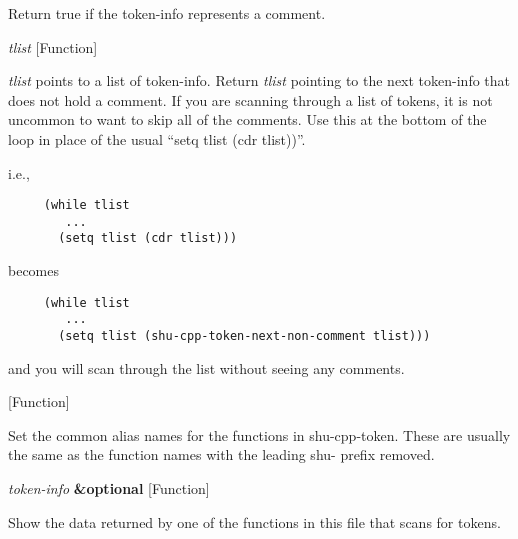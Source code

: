 \begin{doc-string}
Return true if the token-info represents a comment.
\end{doc-string}

\vspace{1em}
\noindent
{}
\usebox{\funcname}\emph{tlist}
 \hfill [Function]

\begin{doc-string}
\emph{tlist} points to a list of token-info.  Return \emph{tlist} pointing to the next
token-info that does not hold a comment.  If you are scanning through a list
of tokens, it is not uncommon to want to skip all of the comments.  Use this
at the bottom of the loop in place of the usual ``setq tlist (cdr tlist))''.

i.e.,

\small{\begin{verbatim}
     (while tlist
        ...
       (setq tlist (cdr tlist)))
\end{verbatim}}

becomes

\small{\begin{verbatim}
     (while tlist
        ...
       (setq tlist (shu-cpp-token-next-non-comment tlist)))
\end{verbatim}}

and you will scan through the list without seeing any comments.
\end{doc-string}

\vspace{1em}
\noindent
{}
\usebox{\funcname}
 \hfill [Function]

\begin{doc-string}
Set the common alias names for the functions in shu-cpp-token.
These are usually the same as the function names with the leading
shu- prefix removed.
\end{doc-string}

\vspace{1em}
\noindent
{}
\usebox{\funcname}\emph{token-info} \textbf{\&optional}
 \hfill [Function]
\hspace*{\wd\funcname}

\begin{doc-string}
Show the data returned by one of the functions in this file that scans for tokens.
\end{doc-string}

